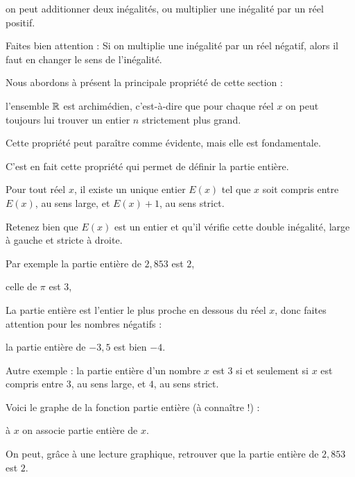 on peut additionner 
deux inégalités, ou multiplier une inégalité par un réel positif. 

Faites bien attention : Si on multiplie une inégalité par un réel négatif, 
alors il faut en changer le sens de l'inégalité.

\diapo

Nous abordons à présent la principale propriété de cette section : 

l'ensemble $\mathbb{R}$ est archimédien, c'est-à-dire que pour chaque réel $x$ on peut toujours 
lui trouver un entier $n$ strictement plus grand.

Cette propriété peut paraître comme évidente, mais elle est fondamentale.

\change

C'est en fait cette propriété qui permet de définir la partie entière.

\change

Pour tout réel $x$, il existe un unique entier $E(x)$ tel que 
$x$ soit compris entre $E(x)$, au sens large, et $E(x)+1$, au sens strict.

Retenez bien que $E(x)$ est un entier et qu'il vérifie cette double inégalité,
large à gauche et stricte à droite.

\change

Par exemple la partie entière de $2,853$ est $2$, 

\change

celle de $\pi$ est $3$, 

\change

La partie entière est l'entier le plus proche en dessous du réel $x$,
donc faites attention pour les nombres négatifs :

la partie entière de  $-3,5$ est bien $-4$.

\change

Autre exemple : la partie entière d'un nombre $x$ est $3$ si et seulement si $x$ 
est compris entre $3$, au sens large, et $4$, au sens strict.

\diapo

Voici le graphe de la fonction partie entière (à connaître !) :

à $x$ on associe partie entière de $x$.

\change

On peut, grâce à une lecture graphique, retrouver que la partie entière de $2,853$ est $2$.

